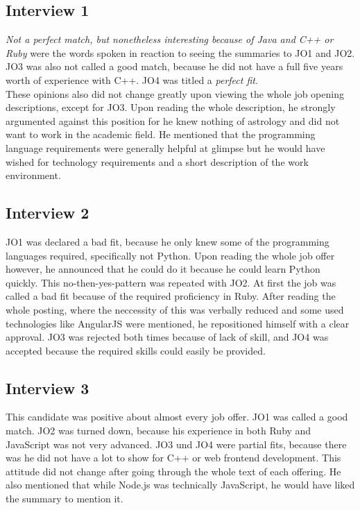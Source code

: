 \subsection{Interview 1}
\textit{Not a perfect match, but nonetheless interesting because of Java and C++ or Ruby} were the words spoken in reaction to seeing the summaries to JO1 and JO2.
JO3 was also not called a good match, because he did not have a
full five years worth of experience with C++. JO4 was titled a \textit{perfect fit}.\\
These opinions also did not change greatly upon viewing the whole job opening
descriptions, except for JO3. Upon reading the whole description, he strongly
argumented against this position for he knew nothing of astrology and did not want
to work in the academic field. He mentioned that the programming language requirements
were generally helpful at glimpse but he would have wished for technology requirements
and a short description of the work environment.

\subsection{Interview 2}
JO1 was declared a bad fit, because he only knew some of the programming languages
required, specifically not Python. Upon reading the whole job offer however, he
announced that he could do it because he could learn Python quickly.
This no-then-yes-pattern was repeated with JO2. At first the job was called a bad fit
because of the required proficiency in Ruby. After reading the whole posting,
where the neccessity of this was verbally reduced and some used
technologies like AngularJS were mentioned, he repositioned himself
with a clear approval.
JO3 was rejected both times because of lack of skill, and
JO4 was accepted because the required skills could easily be provided.

\subsection{Interview 3}
This candidate was positive about almost every job offer. JO1 was called
a good match. JO2 was turned down, because his experience in both Ruby
and JavaScript was not very advanced. JO3 und JO4 were partial fits,
because there was he did not have a lot to show for C++ or web frontend development.
This attitude did not change after going through the whole text of each offering.
He also mentioned that while Node.js was technically JavaScript, he would have
liked the summary to mention it.

